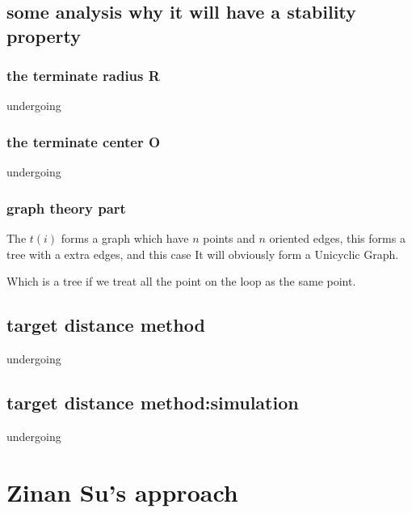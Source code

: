 \documentclass{article}
\theoremstyle{definition} %
\begin{document}
\subsection{some analysis why it will have a stability property}
\subsubsection{the terminate radius R}
undergoing

\subsubsection{the terminate center O}
undergoing

\subsubsection{graph theory part}
The \(t(i)\) forms a graph which have \(n\) points
and \(n\) oriented edges, this forms a tree with a extra
edges, and this case It will obviously form a Unicyclic Graph.

Which is a tree if we treat all the point on the
loop as the same point.

\subsection{target distance method}
undergoing

\subsection{target distance method:simulation}
undergoing

\section{Zinan Su's approach}
\end{document}
